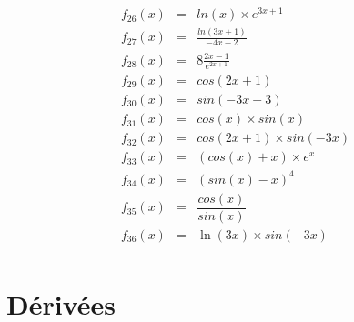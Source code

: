 \documentclass[11pt]{article}
\begin{document}
\begin{multicols}{3}
\begin{eqnarray*}
f_{26}(x) &=& ln(x) \times e^{3x + 1}\\
f_{27}(x) &=& \frac{ln(3x+1)}{-4x+2}\\
f_{28}(x) &=& 8 \frac{2x-1}{e^{2x+1}}\\
f_{29}(x) &=& cos(2x+1)\\
f_{30}(x) &=& sin(-3x-3)\\
f_{31}(x) &=& cos(x) \times sin(x)\\
f_{32}(x) &=& cos(2x+1) \times sin(-3x)\\
f_{33}(x) &=& (cos(x) + x) \times e^{x}\\
f_{34}(x) &=& (sin(x) - x)^{4}\\
f_{35}(x) &=& \dfrac{cos(x)}{sin(x)}\\
f_{36}(x) &=& \ln(3x) \times sin(-3x)\\
\end{eqnarray*}

\section*{Dérivées}


\end{multicols}
\end{document}
